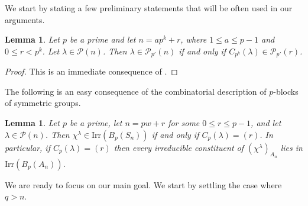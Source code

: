 \documentclass[a4paper,12pt,leqno]{amsart}
\newcommand{\6}{^}
\newtheorem{lem}[subsection]{Lemma}
\theoremstyle{definition}
\theoremstyle{definition}
\theoremstyle{definition}
\theoremstyle{definition}
\theoremstyle{definition}
\begin{document}
We start by stating a few preliminary statements that will be often used in our arguments.  
\begin{lem}\label{lem: olsson1}
Let $p$ be a prime and let $n=ap^k+r$, where $1\leq a\leq p-1$ and $0\leq r<p^k$. Let $\lambda\in\mathcal{P}(n)$. Then $\lambda\in\mathcal{P}_{p'}(n)$ if and only if $C_{p^k}(\lambda)\in\mathcal{P}_{p'}(r)$. 
\end{lem}
\begin{proof}
This is an immediate consequence of \cite[Proposition 6.4]{OlssonBook}. 
\end{proof}

The following is an easy consequence of the combinatorial description of $p$-blocks of symmetric groups. 

\begin{lem}\label{lem: olssonBlocks}
Let $p$ be a prime, let $n=pw+r$ for some $0\leq r\leq p-1$, and let $\lambda\in\mathcal{P}(n)$. Then $\chi^\lambda\in \mathrm{Irr}(B_p(S_n))$ if and only if $C_p(\lambda)=(r)$.  
In particular, if $C_p(\lambda)=(r)$ then every irreducible constituent of $(\chi^\lambda)_{A_n}$ lies in $\mathrm{Irr}(B_p(A_n))$.
\end{lem}


We are ready to focus on our main goal. We start by settling the case where $q>n$.
\end{document}
